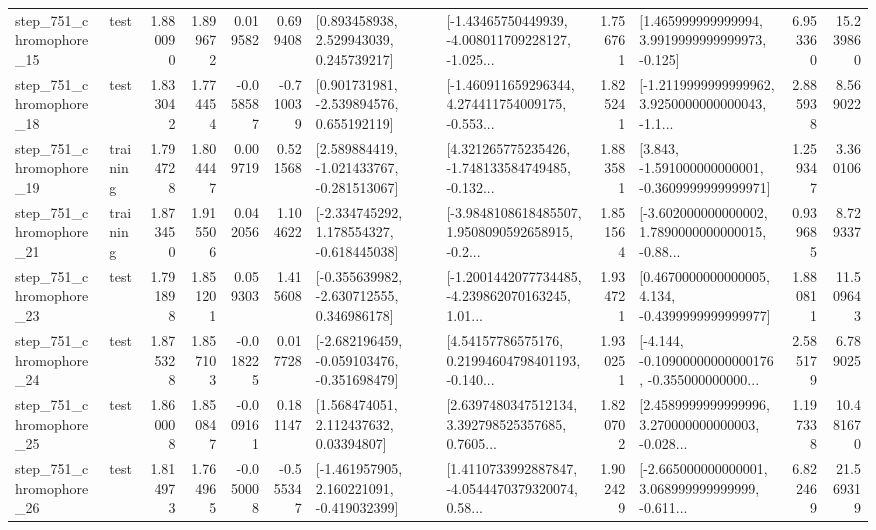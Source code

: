 \begin{tabular}{llrrrrllrlrr}
  step\_751\_chromophore\_15 &      test &      1.880090 &    1.899672 &      0.019582 &  0.699408 &     [0.893458938, 2.529943039, 0.245739217] &  [-1.43465750449939, -4.008011709228127, -1.025... &       1.756761 &    [1.465999999999994, 3.9919999999999973, -0.125] &            6.953360 &         15.239860 \\
  step\_751\_chromophore\_18 &      test &      1.833042 &    1.774454 &     -0.058587 & -0.710039 &    [0.901731981, -2.539894576, 0.655192119] &  [-1.460911659296344, 4.274411754009175, -0.553... &       1.825241 &  [-1.2119999999999962, 3.9250000000000043, -1.1... &            2.885938 &          8.569022 \\
  step\_751\_chromophore\_19 &  training &      1.794728 &    1.804447 &      0.009719 &  0.521568 &   [2.589884419, -1.021433767, -0.281513067] &  [4.321265775235426, -1.748133584749485, -0.132... &       1.883581 &   [3.843, -1.591000000000001, -0.3609999999999971] &            1.259347 &          3.360106 \\
  step\_751\_chromophore\_21 &  training &      1.873450 &    1.915506 &      0.042056 &  1.104622 &   [-2.334745292, 1.178554327, -0.618445038] &  [-3.9848108618485507, 1.9508090592658915, -0.2... &       1.851564 &  [-3.602000000000002, 1.7890000000000015, -0.88... &            0.939685 &          8.729337 \\
  step\_751\_chromophore\_23 &      test &      1.791898 &    1.851201 &      0.059303 &  1.415608 &   [-0.355639982, -2.630712555, 0.346986178] &  [-1.2001442077734485, -4.239862070163245, 1.01... &       1.934721 &   [0.4670000000000005, 4.134, -0.4399999999999977] &            1.880811 &         11.509643 \\
  step\_751\_chromophore\_24 &      test &      1.875328 &    1.857103 &     -0.018225 &  0.017728 &  [-2.682196459, -0.059103476, -0.351698479] &  [4.54157786575176, 0.21994604798401193, -0.140... &       1.930251 &  [-4.144, -0.10900000000000176, -0.355000000000... &            2.585179 &          6.789025 \\
  step\_751\_chromophore\_25 &      test &      1.860008 &    1.850847 &     -0.009161 &  0.181147 &      [1.568474051, 2.112437632, 0.03394807] &  [2.6397480347512134, 3.392798525357685, 0.7605... &       1.820702 &  [2.4589999999999996, 3.270000000000003, -0.028... &            1.197338 &         10.481670 \\
  step\_751\_chromophore\_26 &      test &      1.814973 &    1.764965 &     -0.050008 & -0.555347 &   [-1.461957905, 2.160221091, -0.419032399] &  [1.4110733992887847, -4.0544470379320074, 0.58... &       1.902429 &  [-2.665000000000001, 3.068999999999999, -0.611... &            6.822469 &         21.569319 \\

\end{tabular}
